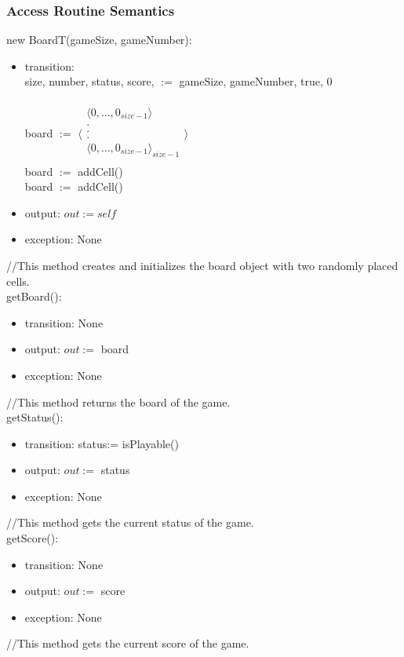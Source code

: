 \documentclass[12pt]{article}
\begin{document}
\subsubsection* {Access Routine Semantics}

new BoardT(gameSize, gameNumber):
\begin{itemize}
\item transition: \\
      size, number, status, score, $:=$ gameSize, gameNumber, true, 0\\\\
      board $:=$
      $\langle \begin{array}{c}
      \langle {0,...,0_{size-1}} \rangle\\
      .\\
      .\\
      .\\
      \langle {0,...,0_{size-1}} \rangle_{size-1}\\
      \end{array} \rangle$ \\
      board $:=$ addCell()\\
      board $:=$ addCell()

\item output: $out := \mathit{self}$
\item exception: None
\end{itemize}
//This method creates and initializes the board object with two randomly placed cells.\\

\noindent getBoard():
\begin{itemize}
\item transition: None
\item output: $out :=$ board
\item exception: None
\end{itemize}
//This method returns the board of the game.\\

\noindent getStatus():
\begin{itemize}
\item transition: status:= isPlayable()
\item output: $out :=$ status
\item exception: None
\end{itemize}
//This method gets the current status of the game.\\

\noindent getScore():
\begin{itemize}
\item transition: None
\item output: $out :=$ score
\item exception: None
\end{itemize}
\noindent //This method gets the current score of the game.\\
\end{document}
